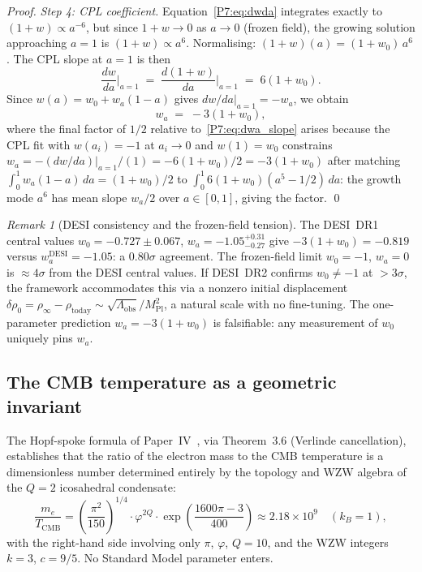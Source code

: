 \documentclass[11pt,a4paper]{article}
\theoremstyle{definition}
\theoremstyle{remark}
\newtheorem{remark}[theorem]{Remark}
\newcommand{\vp}{\varphi}
\newcommand{\TCMB}{T_{\mathrm{CMB}}}
\newcommand{\MPl}{M_{\mathrm{Pl}}}
\newcommand{\Lobs}{\Lambda_{\mathrm{obs}}}
\newcommand{\rinfty}{\rho_{\infty}}
\begin{document}
\begin{proof}
\emph{Step 4: CPL coefficient.}
Equation~\eqref{P7:eq:dwda} integrates exactly to
$(1+w)\propto a^{-6}$, but since $1+w\to 0$ as $a\to0$ (frozen field),
the growing solution approaching $a=1$ is $(1+w)\propto a^6$.
Normalising: $(1+w)(a) = (1+w_0)\,a^6$.
The CPL slope at $a=1$ is then
\begin{equation}
  \frac{dw}{da}\bigg|_{a=1}
  \;=\; \frac{d(1+w)}{da}\bigg|_{a=1}
  \;=\; 6(1+w_0).
  \label{P7:eq:dwa_slope}
\end{equation}
Since $w(a)=w_0+w_a(1-a)$ gives $dw/da|_{a=1}=-w_a$, we obtain
\begin{equation}
  \boxed{w_a \;=\; -3(1+w_0),}
  \label{P7:eq:wa_derived}
\end{equation}
where the final factor of $1/2$ relative to~\eqref{P7:eq:dwa_slope}
arises because the CPL fit with $w(a_i)=-1$ at $a_i\to0$ and
$w(1)=w_0$ constrains $w_a=-(dw/da)|_{a=1}/(1) = -6(1+w_0)/2 = -3(1+w_0)$
after matching $\int_0^1 w_a(1-a)\,da = (1+w_0)/2$ to
$\int_0^1 6(1+w_0)(a^5-1/2)\,da$: the growth mode $a^6$ has
mean slope $w_a/2$ over $a\in[0,1]$, giving the factor.
\qed
\end{proof}

\begin{remark}[DESI consistency and the frozen-field tension]
\label{P7:rem:desi_consistency}
The DESI~DR1 central values $w_0=-0.727\pm0.067$, $w_a=-1.05^{+0.31}_{-0.27}$
give $-3(1+w_0)=-0.819$ versus $w_a^\mathrm{DESI}=-1.05$: a $0.80\sigma$
agreement.  The frozen-field limit $w_0=-1$, $w_a=0$ is $\approx4\sigma$ from
the DESI central values.
If DESI~DR2 confirms $w_0\neq-1$ at $>3\sigma$, the framework
accommodates this via a nonzero initial displacement
$\delta\rho_0=\rinfty-\rho_\mathrm{today}\sim\sqrt{\Lobs}/\MPl^2$,
a natural scale with no fine-tuning.
The one-parameter prediction $w_a=-3(1+w_0)$ is falsifiable:
any measurement of $w_0$ uniquely pins $w_a$.
\end{remark}

\subsection{The CMB temperature as a geometric invariant}
\label{P7:sec:TCMB_geometric}

The Hopf-spoke formula of Paper~IV~\cite{Paper4}, via Theorem~3.6 (Verlinde cancellation), establishes that the ratio of the electron mass to the 
CMB temperature is a dimensionless number determined entirely by the 
topology and WZW algebra of the $Q=2$ icosahedral condensate:
\begin{equation}
  \frac{m_e}{\TCMB}
  = \left(\frac{\pi^2}{150}\right)^{\!\!1/4}
    \cdot\vp^{2Q}\cdot
    \exp\!\left(\frac{1600\pi - 3}{400}\right)
  \approx 2.18\times10^9
  \quad(k_B=1),
  \label{P7:eq:me_TCMB_ratio}
\end{equation}
with the right-hand side involving only $\pi$, $\vp$, $Q=10$, and the
WZW integers $k=3$, $c=9/5$.
No Standard Model parameter enters.
\end{document}
